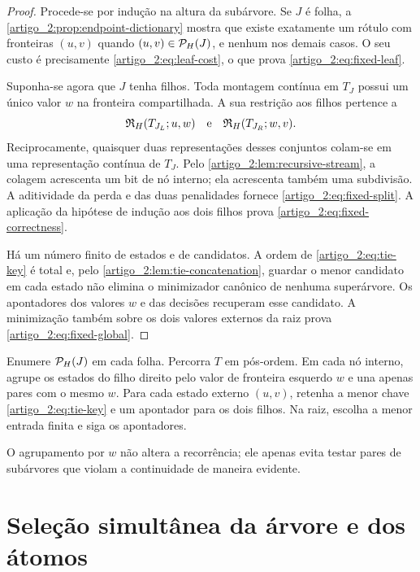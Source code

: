 \begin{proof}
Procede-se por indução na altura da subárvore. Se $J$ é folha, a
\cref{artigo_2:prop:endpoint-dictionary} mostra que existe exatamente um rótulo com
fronteiras $(u,v)$ quando $(u,v)\in\mathcal{P}_H(J)$, e nenhum nos demais casos.
O seu custo é precisamente \eqref{artigo_2:eq:leaf-cost}, o que prova
\eqref{artigo_2:eq:fixed-leaf}.

Suponha-se agora que $J$ tenha filhos. Toda montagem contínua em $T_J$ possui um
único valor $w$ na fronteira compartilhada. A sua restrição aos filhos pertence
a
\[
 \mathfrak{R}_H(T_{J_L};u,w)
 \quad\text{e}\quad
 \mathfrak{R}_H(T_{J_R};w,v).
\]
Reciprocamente, quaisquer duas representações desses conjuntos colam-se em
uma representação contínua de $T_J$. Pelo \cref{artigo_2:lem:recursive-stream}, a
colagem acrescenta um bit de nó interno; ela acrescenta também uma
subdivisão. A aditividade da perda e das duas penalidades fornece
\eqref{artigo_2:eq:fixed-split}. A aplicação da hipótese de indução aos dois filhos prova
\eqref{artigo_2:eq:fixed-correctness}.

Há um número finito de estados e de candidatos. A ordem de
\eqref{artigo_2:eq:tie-key} é total e, pelo \cref{artigo_2:lem:tie-concatenation}, guardar o
menor candidato em cada estado não elimina o minimizador canônico de nenhuma
superárvore. Os apontadores dos valores $w$ e das decisões recuperam esse
candidato. A minimização também sobre os dois valores externos da raiz prova
\eqref{artigo_2:eq:fixed-global}.
\end{proof}

\begin{algorithm}\label{map:artigo_2:6.3}
\label{artigo_2:alg:fixed-tree}
Enumere $\mathcal{P}_H(J)$ em cada folha. Percorra $T$ em pós-ordem. Em cada nó
interno, agrupe os estados do filho direito pelo valor de fronteira esquerdo
$w$ e una apenas pares com o mesmo $w$. Para cada estado externo $(u,v)$,
retenha a menor chave \eqref{artigo_2:eq:tie-key} e um apontador para os dois filhos.
Na raiz, escolha a menor entrada finita e siga os apontadores.
\end{algorithm}

O agrupamento por $w$ não altera a recorrência; ele apenas evita testar pares
de subárvores que violam a continuidade de maneira evidente.

\section{Seleção simultânea da árvore e dos átomos}
\label{artigo_2:sec:variable-dp}

